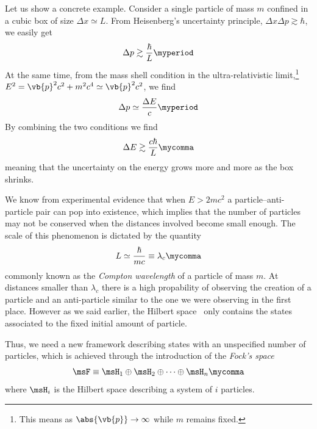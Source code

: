             Let us show a concrete example. Consider a single particle of mass $m$ confined in a cubic box of size $\Delta x \simeq L$. From Heisenberg's uncertainty principle, $\Delta x \Delta p \gtrsim \hbar$, we easily get
            \begin{equation*}
                \Delta p \gtrsim \frac{\hbar}{L}
                \myperiod
            \end{equation*}
            At the same time, from the mass shell condition in the ultra-relativistic limit,\footnote{This means as $\abs{\vb{p}}\to\infty$ while $m$ remains fixed.} $E^2 = \vb{p}^2 c^2 + m^2 c^4 \simeq \vb{p}^2 c^2$, we find
            \begin{equation*}
                \Delta p \simeq \frac{\Delta E}{c}
                \myperiod
            \end{equation*}
            By combining the two conditions we find
            \begin{equation}
                \Delta E \gtrsim \frac{c\hbar}{L}
                \mycomma
            \end{equation}
            meaning that the uncertainty on the energy grows more and more as the box shrinks.

            We know from experimental evidence that when $E > 2 m c^2$ a particle--anti-particle pair can pop into existence, which implies that the number of particles may not be conserved when the distances involved become small enough. The scale of this phenomenon is dictated by the quantity
            \begin{equation*}
                L \simeq \frac{\hbar}{m c} \equiv \lambda_c 
                \mycomma
            \end{equation*}
            commonly known as the \emph{Compton wavelength} of a particle of mass $m$. At distances smaller than $\lambda_c$ there is a high propability of observing the creation of a particle and an anti-particle similar to the one we were observing in the first place. However as we said earlier, the Hilbert space \msH\ only contains the states associated to the fixed initial amount of particle.

            Thus, we need a new framework describing states with an unspecified number of particles, which is achieved through the introduction of the \emph{Fock's space}
            \begin{equation}
                \label{eq:Focks-space}
                \msF \equiv \msH_1 \oplus \msH_2 \oplus \dotsb \oplus \msH_n
                \mycomma
            \end{equation}
            where $\msH_i$ is the Hilbert space describing a system of $i$ particles.
        
